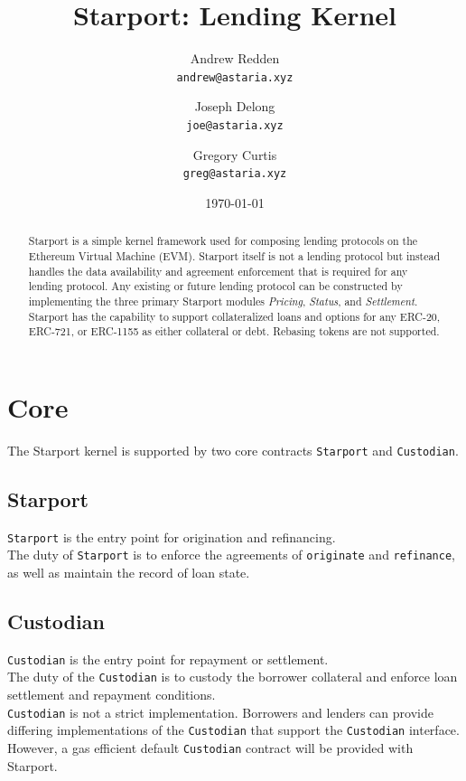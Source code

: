 \documentclass[12pt]{article}
\title{Starport: Lending Kernel}
\author{Andrew Redden \\ \texttt{andrew@astaria.xyz}
        \and
        Joseph Delong \\ \texttt{joe@astaria.xyz}
        \and
        Gregory Curtis \\ \texttt{greg@astaria.xyz}}
\date{\today}
\begin{document}
\maketitle

\begin{abstract}
Starport is a simple kernel framework used for composing lending protocols on the Ethereum Virtual Machine (EVM).
Starport itself is not a lending protocol but instead handles the data availability and agreement enforcement that is required for any lending protocol.
Any existing or future lending protocol can be constructed by implementing the three primary Starport modules \emph{Pricing}, \emph{Status}, and \emph{Settlement}.\\

Starport has the capability to support collateralized loans and options for any ERC-20\cite{erc20}, ERC-721\cite{erc721}, or ERC-1155\cite{erc1155} as either collateral or debt. Rebasing tokens are not supported.
\end{abstract}

\section{Core}
The Starport kernel is supported by two core contracts \texttt{Starport} and \texttt{Custodian}.
\subsection{Starport}

\texttt{Starport} is the entry point for origination and refinancing.\\

The duty of \texttt{Starport} is to enforce the agreements of \texttt{originate} and \texttt{refinance}, as well as maintain the record of loan state.

\subsection{Custodian}

\texttt{Custodian} is the entry point for repayment or settlement.\\

The duty of the \texttt{Custodian} is to custody the borrower collateral and enforce loan settlement and repayment conditions.\\

\texttt{Custodian} is not a strict implementation. Borrowers and lenders can provide differing implementations of the \texttt{Custodian} that support the \texttt{Custodian} interface. However, a gas efficient default \texttt{Custodian} contract will be provided with Starport.
\end{document}
